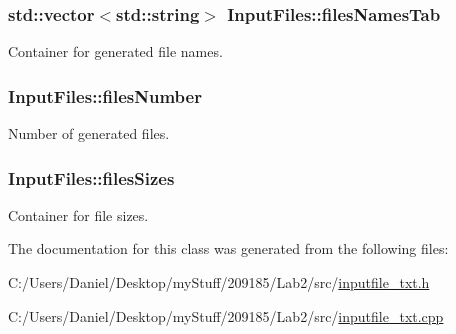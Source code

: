 \subsubsection[{files\+Names\+Tab}]{\setlength{\rightskip}{0pt plus 5cm}std\+::vector$<$std\+::string$>$ Input\+Files\+::files\+Names\+Tab\hspace{0.3cm}{\ttfamily [private]}}\label{class_input_files_abbdfa73eda4af470d13c3d54a8665a0e}


Container for generated file names. 

\hypertarget{class_input_files_a9614705947e6240bc2daa8cf3db42310}{}
\subsubsection[{files\+Number}]{\setlength{\rightskip}{0pt plus 5cm}Input\+Files\+::files\+Number\hspace{0.3cm}{\ttfamily [private]}}\label{class_input_files_a9614705947e6240bc2daa8cf3db42310}


Number of generated files. 

\hypertarget{class_input_files_a2d6426414a58ca39751e3b26135341e0}{}
\subsubsection[{files\+Sizes}]{\setlength{\rightskip}{0pt plus 5cm}Input\+Files\+::files\+Sizes\hspace{0.3cm}{\ttfamily [private]}}\label{class_input_files_a2d6426414a58ca39751e3b26135341e0}


Container for file sizes. 



The documentation for this class was generated from the following files\+:\begin{DoxyCompactItemize}
\item 
C\+:/\+Users/\+Daniel/\+Desktop/my\+Stuff/209185/\+Lab2/src/\hyperlink{inputfile__txt_8h}{inputfile\+\_\+txt.\+h}\item 
C\+:/\+Users/\+Daniel/\+Desktop/my\+Stuff/209185/\+Lab2/src/\hyperlink{inputfile__txt_8cpp}{inputfile\+\_\+txt.\+cpp}\end{DoxyCompactItemize}
